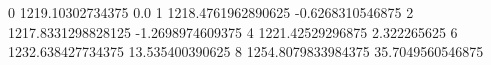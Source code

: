 0 1219.10302734375 0.0
1 1218.4761962890625 -0.6268310546875
2 1217.8331298828125 -1.2698974609375
4 1221.42529296875 2.322265625
6 1232.638427734375 13.535400390625
8 1254.8079833984375 35.7049560546875
